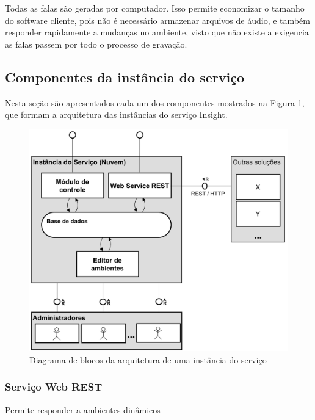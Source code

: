 \documentclass[english,brazilian]{UNISINOSmonografia}
\begin{document}
Todas as falas são geradas por computador. Isso permite economizar o tamanho do software cliente, pois não é necessário armazenar arquivos de áudio, e também responder rapidamente a mudanças no ambiente, visto que não existe a exigencia as falas passem por todo o processo de gravação.

	\subsection{Componentes da instância do serviço}
Nesta seção são apresentados cada um dos componentes mostrados na Figura \ref{fig:arquiteturaServico}, que formam a arquitetura das instâncias do serviço Insight.

\begin{figure}[!ht]
	\caption{Diagrama de blocos da arquitetura de uma instância do serviço}
	\label{fig:arquiteturaServico}
	\centering%
	\begin{minipage}{.8\textwidth}
		\includegraphics[width=\textwidth]{imgs/arquiteturaServico.png}
	\end{minipage}
\end{figure}

		\subsubsection{Serviço Web REST}

			Permite responder a ambientes dinâmicos
\end{document}
